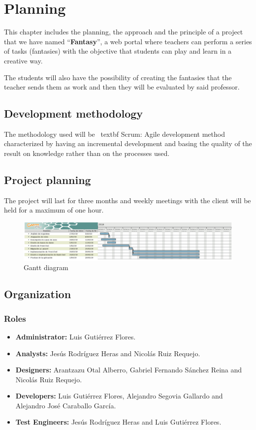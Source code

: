 \chapter{Planning}
This chapter includes the planning, the approach and the principle of a project that we have named ``\textbf{Fantasy}'', a web portal where teachers can perform a series of tasks (fantasies) with the objective that students can play and learn in a creative way.

The students will also have the possibility of creating the fantasies that the teacher sends them as work and then they will be evaluated by said professor.

\section{Development methodology}
The methodology used will be \ textbf {Scrum}: Agile development method characterized by having an incremental development and basing the quality of the result on knowledge rather than on the processes used.

\section{Project planning}
The project will last for three months and weekly meetings with the client will be held for a maximum of one hour.
\begin{figure}[h]
	\centering
	\includegraphics[scale=0.85]{Gantt.pdf}
	\caption{Gantt diagram}
	\label{Gantt diagram}
\end{figure}

\section{Organization}
\subsection{Roles}
\begin{itemize}
	\item \textbf{Administrator:} Luis Gutiérrez Flores.
	\item \textbf{Analysts:} Jesús Rodríguez Heras and Nicolás Ruiz Requejo.
	\item \textbf{Designers:} Arantzazu Otal Alberro, Gabriel Fernando Sánchez Reina and Nicolás Ruiz Requejo.
	\item \textbf{Developers:} Luis Gutiérrez Flores, Alejandro Segovia Gallardo and Alejandro José Caraballo García.
	\item \textbf{Test Engineers:} Jesús Rodríguez Heras and Luis Gutiérrez Flores.
\end{itemize}

